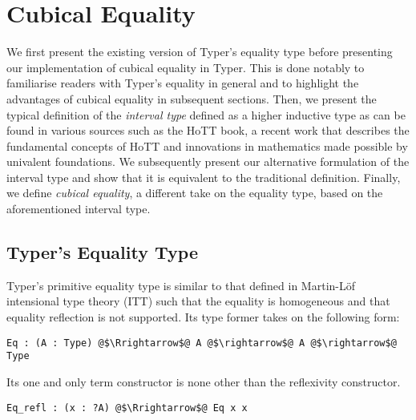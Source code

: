 \documentclass[12pt,twoside,maitrise]{dms}
\theoremstyle{definition}
\numberwithin{equation}{section}
\numberwithin{table}{chapter}
\numberwithin{figure}{chapter}
\begin{document}
\section{Cubical Equality}\label{sec:cubical-equality}

We first present the existing version of Typer's equality type before presenting
our implementation of cubical equality in Typer. This is done notably to
familiarise readers with Typer's equality in general and to highlight the
advantages of cubical equality in subsequent sections. Then, we present the
typical definition of the \emph{interval type} defined as a higher inductive
type as can be found in various sources such as the HoTT
book\cite[Chap~6.3]{HoTTbook}, a recent work that describes the fundamental
concepts of HoTT and innovations in mathematics made possible by univalent
foundations. We subsequently present our alternative formulation of the interval
type and show that it is equivalent to the traditional definition. Finally, we
define \emph{cubical equality}, a different take on the equality type, based on
the aforementioned interval type.

\subsection{Typer's Equality Type}\label{sec:typer-old-eq}

Typer's primitive equality type is similar to that defined in Martin-Löf
intensional type theory\cite{martin1975intuitionistic} (ITT) such that the
equality is homogeneous and that equality reflection is not supported. Its type
former takes on the following form:

\begin{verbatim}
Eq : (A : Type) @$\Rrightarrow$@ A @$\rightarrow$@ A @$\rightarrow$@ Type
\end{verbatim}

Its one and only term constructor is none other than the reflexivity constructor.

\begin{verbatim}
Eq_refl : (x : ?A) @$\Rrightarrow$@ Eq x x
\end{verbatim}
\end{document}
